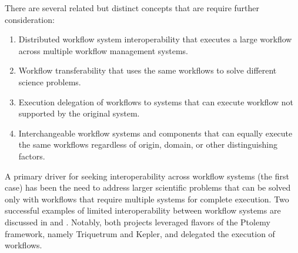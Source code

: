 There are several related but distinct concepts that are require further
consideration:


\begin{enumerate}
\item Distributed workflow system interoperability that executes a
large workflow across multiple workflow management systems. 
\item Workflow transferability that uses the same workflows to solve different
science problems.
\item Execution delegation of workflows to systems that can execute workflow
not supported by the original system. 
\item Interchangeable workflow systems and components that can
equally execute the same workflows regardless of origin, domain,
or other distinguishing factors.
\end{enumerate} 

A primary driver for seeking interoperability across workflow systems (the
first case) has been the need to address larger scientific problems that can
be solved only with workflows that require multiple systems for complete
execution. Two successful examples of limited interoperability between workflow
systems are discussed in \cite{brooks_triquetrum:_2015} and
\cite{mandal_integrating_2007}. Notably, both projects leveraged flavors of the
Ptolemy framework, namely Triquetrum and Kepler, and delegated the execution of
workflows.
